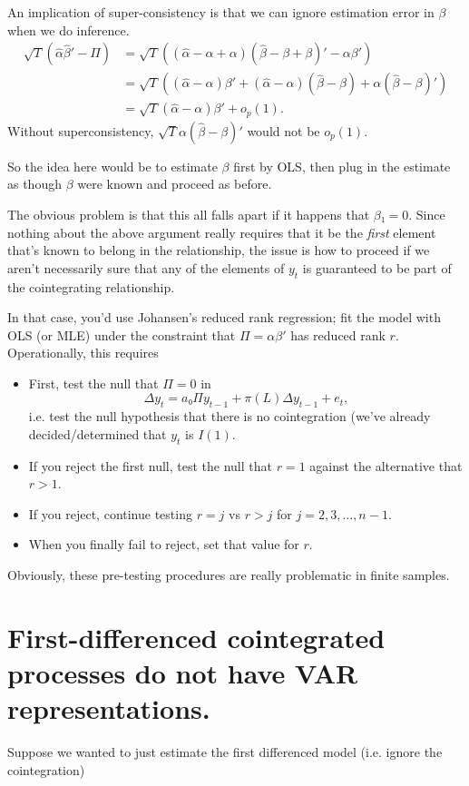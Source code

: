 An implication of super-consistency is that we can ignore estimation
error in $β$ when we do inference.
\begin{align*}
  \sqrt{T} (\hat α \hat β' - Π)
  &= \sqrt{T} ((\hat α - α + α) (\hat β - β + β)' - αβ') \\
  &= \sqrt{T} ((\hat α - α) β' + (\hat α - α) (\hat β - β) + α (\hat β - β)') \\
  &= \sqrt{T} (\hat α - α) β' + o_p(1).
\end{align*}
Without superconsistency, $\sqrt{T} α (\hat β - β)'$ would not be $o_p(1)$.

So the idea here would be to estimate $β$ first by OLS, then plug in
the estimate as though $β$ were known and proceed as before.

The obvious problem is that this all falls apart if it happens that
$β₁=0$.  Since nothing about the above argument really requires that
it be the \textit{first} element that's known to belong in the
relationship, the issue is how to proceed if we aren't necessarily
sure that any of the elements of $y_t$ is guaranteed to be part of the
cointegrating relationship.

In that case, you'd use Johansen's reduced rank regression; fit the
model with OLS (or MLE) under the constraint that $Π = αβ'$ has
reduced rank $r$.  Operationally, this requires
\begin{itemize}
\item First, test the null that $Π = 0$ in 
  \[ Δy_t = a₀ Π y_{t-1} + π(L) Δy_{t-1} + e_t, \] i.e. test the null
  hypothesis that there is no cointegration (we've already
  decided/determined that $y_t$ is $I(1)$.
\item If you reject the first null, test the null that $r=1$ against
  the alternative that $r>1$.
\item If you reject, continue testing $r=j$ vs $r>j$ for
  $j=2,3,…,n-1$.
\item When you finally fail to reject, set that value for $r$.
\end{itemize}

Obviously, these pre-testing procedures are really problematic in
finite samples.

\section{First-differenced cointegrated processes do not have VAR
  representations.}

Suppose we wanted to just estimate the first differenced model
(i.e. ignore the cointegration)

